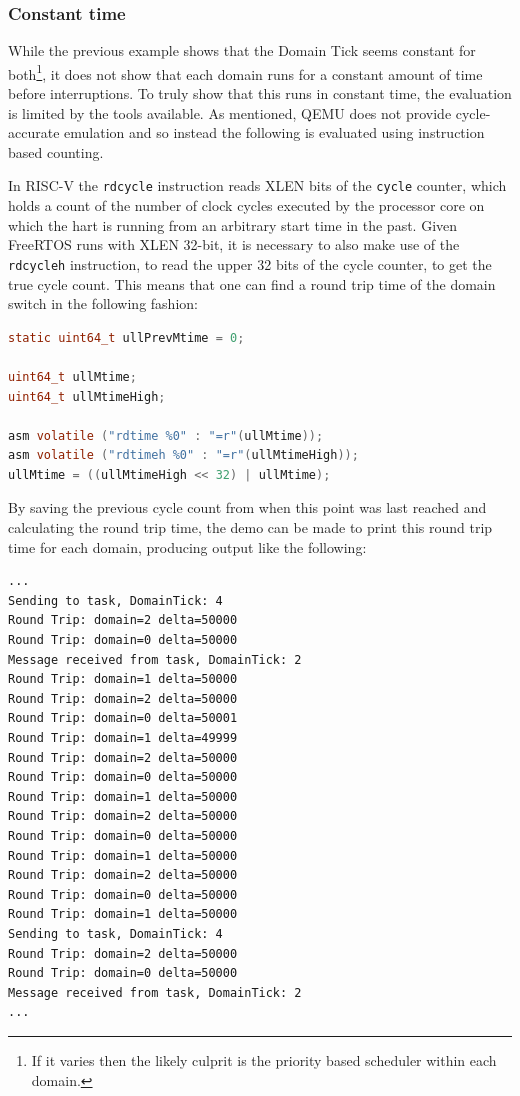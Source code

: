 \subsubsection{Constant time}
While the previous example shows that the Domain Tick seems constant for
both\footnote{If it varies then the likely culprit is the priority based
scheduler within each domain.}, it does not show that each domain runs for a
constant amount of time before interruptions. To truly show that this runs in
constant time, the evaluation is limited by the tools available. As mentioned,
QEMU does not provide cycle-accurate emulation and so instead the following is
evaluated using instruction based counting.

In RISC-V the \texttt{rdcycle} instruction reads XLEN bits of the
\texttt{cycle} counter, which holds a count of the number of clock cycles
executed by the processor core on which the hart is running from an arbitrary
start time in the past. Given FreeRTOS runs with XLEN 32-bit, it is necessary
to also make use of the \texttt{rdcycleh} instruction, to read the upper 32
bits of the cycle counter, to get the true cycle count. This means that one can
find a round trip time of the domain switch in the following fashion:
\begin{lstlisting}[language={c}]
static uint64_t ullPrevMtime = 0;

uint64_t ullMtime;
uint64_t ullMtimeHigh;

asm volatile ("rdtime %0" : "=r"(ullMtime));
asm volatile ("rdtimeh %0" : "=r"(ullMtimeHigh));
ullMtime = ((ullMtimeHigh << 32) | ullMtime);
\end{lstlisting}

By saving the previous cycle count from when this point was last reached and
calculating the round trip time, the demo can be made to print this round trip
time for each domain, producing output like the following:

\begin{verbatim}
...
Sending to task, DomainTick: 4
Round Trip: domain=2 delta=50000
Round Trip: domain=0 delta=50000
Message received from task, DomainTick: 2
Round Trip: domain=1 delta=50000
Round Trip: domain=2 delta=50000
Round Trip: domain=0 delta=50001
Round Trip: domain=1 delta=49999
Round Trip: domain=2 delta=50000
Round Trip: domain=0 delta=50000
Round Trip: domain=1 delta=50000
Round Trip: domain=2 delta=50000
Round Trip: domain=0 delta=50000
Round Trip: domain=1 delta=50000
Round Trip: domain=2 delta=50000
Round Trip: domain=0 delta=50000
Round Trip: domain=1 delta=50000
Sending to task, DomainTick: 4
Round Trip: domain=2 delta=50000
Round Trip: domain=0 delta=50000
Message received from task, DomainTick: 2
...
\end{verbatim}

